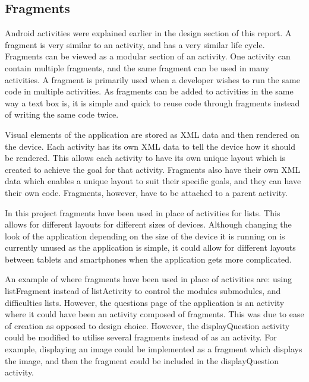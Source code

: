 \documentclass{article}
\begin{document}
\subsection{Fragments}

Android activities were explained earlier in the design section of this report. A fragment is very similar to an activity, and has a very similar life cycle. Fragments can be viewed as a modular section of an activity. One activity can contain multiple fragments, and the same fragment can be used in many activities. A fragment is primarily used when a developer wishes to run the same code in multiple activities. As fragments can be added to activities in the same way a text box is, it is simple and quick to reuse code through fragments instead of writing the same code twice. \par

Visual elements of the application are stored as XML data and then rendered on the device. Each activity has its own XML data to tell the device how it should be rendered. This allows each activity to have its own unique layout which is created to achieve the goal for that activity. Fragments also have their own XML data which enables a unique layout to suit their specific goals, and they can have their own code. Fragments, however, have to be attached to a parent activity.  \par

In this project fragments have been used in place of activities for lists. This allows for different layouts for different sizes of devices. Although changing the look of the application depending on the size of the device it is running on is currently unused as the application is simple, it could allow for different layouts between tablets and smartphones when the application gets more complicated. \par

An example of where fragments have been used in place of activities are: using listFragment instead of listActivity to control the modules submodules, and difficulties lists. However, the questions page of the application is an activity where it could have been an activity composed of fragments. This was due to ease of creation as opposed to design choice. However, the displayQuestion activity could be modified to utilise several fragments instead of as an activity. For example, displaying an image could be implemented as a fragment which displays the image, and then the fragment could be included in the displayQuestion activity. \par
\end{document}
